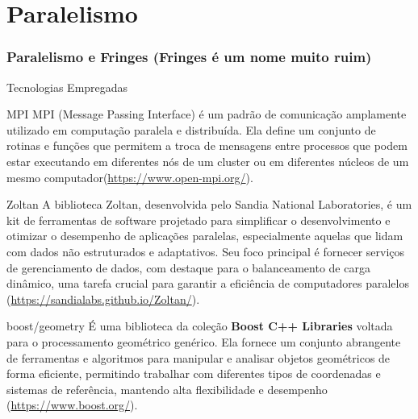 \documentclass[../main/main.tex]{subfiles}
\begin{document}
\section{Paralelismo}




\begin{frame}
	\frametitle{Paralelismo e Fringes (Fringes é um nome muito ruim)}
\end{frame}



\begin{frame}{\smaller \smaller Tecnologias Empregadas}
	\vspace{-0.25cm}
	\smaller
	\begin{block}{\smaller MPI}
		MPI (Message Passing Interface) é um padrão de comunicação amplamente utilizado em computação paralela e distribuída. Ela define um conjunto de rotinas e funções que permitem a troca de mensagens entre processos que podem estar executando em diferentes nós de um cluster ou em diferentes núcleos de um mesmo computador(\url{https://www.open-mpi.org/}).
	\end{block}
	\begin{block}{\smaller Zoltan}
		A biblioteca Zoltan, desenvolvida pelo Sandia National Laboratories, é um kit de ferramentas de software projetado para simplificar o desenvolvimento e otimizar o desempenho de aplicações paralelas, especialmente aquelas que lidam com dados não estruturados e adaptativos. Seu foco principal é fornecer serviços de gerenciamento de dados, com destaque para o balanceamento de carga dinâmico, uma tarefa crucial para garantir a eficiência de computadores paralelos (\url{https://sandialabs.github.io/Zoltan/}).
	\end{block}
	\begin{block}{\smaller boost/geometry}
		É uma biblioteca da coleção \textbf{Boost C++ Libraries} voltada para o processamento geométrico genérico. Ela fornece um conjunto abrangente de ferramentas e algoritmos para manipular e analisar objetos geométricos de forma eficiente, permitindo trabalhar com diferentes tipos de coordenadas e sistemas de referência, mantendo alta flexibilidade e desempenho (\url{https://www.boost.org/}).
	\end{block}
\end{frame}
\end{document}
